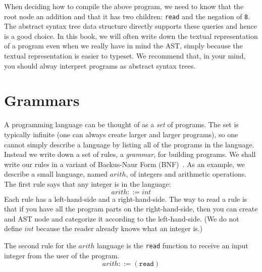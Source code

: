 \documentclass[12pt]{book}
\newcommand{\itm}[1]{\ensuremath{\mathit{#1}}}
\newcommand{\Int}{\itm{int}}
\newcommand{\key}[1]{\texttt{#1}}
\begin{document}
When deciding how to compile the above program, we need to know that
the root node an addition and that it has two children: \texttt{read}
and the negation of \texttt{8}. The abstract syntax tree data
structure directly supports these queries and hence is a good
choice. In this book, we will often write down the textual
representation of a program even when we really have in mind the AST,
simply because the textual representation is easier to typeset.  We
recommend that, in your mind, you should alway interpret programs as
abstract syntax trees.

\section{Grammars}
\label{sec:grammar}

A programming language can be thought of as a \emph{set} of programs.
The set is typically infinite (one can always create larger and larger
programs), so one cannot simply describe a language by listing all of
the programs in the language. Instead we write down a set of rules, a
\emph{grammar}, for building programs. We shall write our rules in a
variant of Backus-Naur Form (BNF)~\citep{Backus:1960aa,Knuth:1964aa}.
As an example, we describe a small language, named $\itm{arith}$, of
integers and arithmetic operations. The first rule says that any
integer is in the language:
\begin{equation}
\itm{arith} ::= \Int  \label{eq:arith-int}
\end{equation}
Each rule has a left-hand-side and a right-hand-side. The way to read
a rule is that if you have all the program parts on the
right-hand-side, then you can create and AST node and categorize it
according to the left-hand-side. (We do not define $\Int$ because the
reader already knows what an integer is.)

The second rule for the $\itm{arith}$ language is the \texttt{read}
function to receive an input integer from the user of the program.
\begin{equation}
  \itm{arith} ::= (\key{read}) \label{eq:arith-read}
\end{equation}
\end{document}

